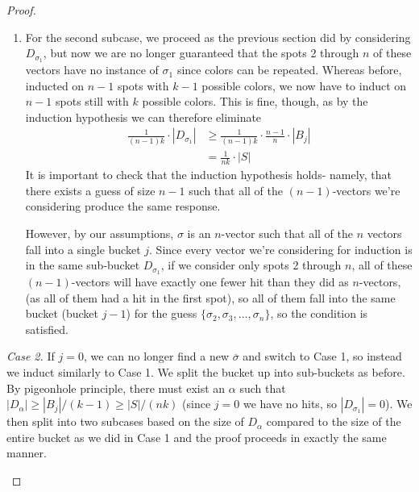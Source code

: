 \documentclass[12pt, a4paper]{article}
\begin{document}
\begin{proof}
\begin{enumerate}
\begin{enumerate}[label=\roman*.]
		\item For the second subcase, we proceed as the previous section did by
		considering $D_{\sigma_1}$, but now we are no longer guaranteed that the spots
		2 through $n$ of these vectors have no
		instance of $\sigma_1$
		since colors can be repeated. Whereas before, inducted on $n-1$ spots with
		$k-1$ possible colors, we now have to induct on $n-1$ spots still with $k$
		possible colors. This is fine,
		though, as by the induction hypothesis we can therefore eliminate
			\begin{align*}
			\frac{1}{(n-1)k}\cdot|D_{\sigma_1}|
			& \ge \frac{1}{(n-1)k}\cdot\frac{n-1}{n}\cdot|B_j|\\
			& = \frac{1}{nk}\cdot|S|
			\end{align*}
		It is important to check that the induction hypothesis holds- namely, that
		there exists a guess of size $n-1$ such that all of the $(n-1)$-vectors
		we're considering produce the same response.
		
		However, by our assumptions, $\sigma$ is an $n$-vector such that all of the
		$n$ vectors fall into a  single bucket $j$. Since every vector we're
		considering for induction is in the same sub-bucket 
		$D_{\sigma_1}$, if we consider only spots 2 through $n$, all of these
		$(n-1)$-vectors will have exactly one fewer hit than they did as $n$-vectors,
		(as all of them had a hit in the first spot), so all of them fall into the
		same bucket (bucket $j-1$) for the guess
		$\{\sigma_2, \sigma_3, \ldots, \sigma_n\}$, so the condition is satisfied.
		\end{enumerate}

		\textit{Case 2.} If $j=0$, we can no longer find a new $\overline{\sigma}$
		and switch to Case 1, so instead we
		induct similarly to Case 1. We split the
		bucket up into sub-buckets as before. By pigeonhole principle, there must exist
		an $\alpha$ such that
		$|D_\alpha| \ge |B_j|/(k-1) \ge |S|/(nk)$ (since $j=0$ we have no hits, so
		$|D_{\sigma_1}| = 0$).  We then 
		split into two subcases based on the size of $D_\alpha$ compared to the size of
		the entire bucket as we did in Case 1 and the proof proceeds in exactly the
		same manner.
		\end{enumerate}
	\end{proof}
	
\clearpage
\end{document}
